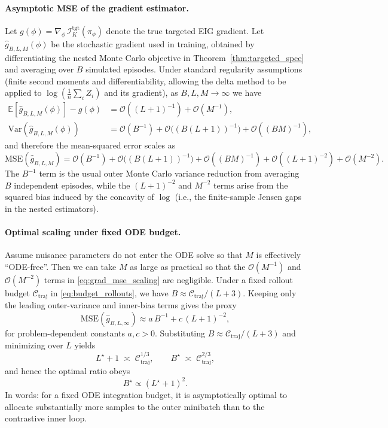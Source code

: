 \paragraph{Asymptotic MSE of the gradient estimator.}
Let $g(\phi)=\nabla_\phi\,\mathcal{I}_K^{\text{tgt}}(\pi_\phi)$ denote the true targeted EIG gradient.
Let $\hat g_{B,L,M}(\phi)$ be the stochastic gradient used in training, obtained by differentiating the nested Monte Carlo objective in Theorem~\ref{thm:targeted_spce} and averaging over $B$ simulated episodes.
Under standard regularity assumptions (finite second moments and differentiability, allowing the delta method to be applied to $\log(\tfrac{1}{n}\sum_i Z_i)$ and its gradient), as $B,L,M\to\infty$ we have
\begin{align}
\mathbb{E}[\hat g_{B,L,M}(\phi)] - g(\phi) &= \mathcal{O}((L+1)^{-1}) + \mathcal{O}(M^{-1}), \\
\mathrm{Var}(\hat g_{B,L,M}(\phi)) &= \mathcal{O}(B^{-1}) + \mathcal{O}\big((B(L+1))^{-1}\big) + \mathcal{O}((BM)^{-1}),
\end{align}
and therefore the mean-squared error scales as
\begin{equation}
\label{eq:grad_mse_scaling}
\mathrm{MSE}(\hat g_{B,L,M})
= \mathcal{O}(B^{-1})
+ \mathcal{O}\big((B(L+1))^{-1}\big)
+ \mathcal{O}((BM)^{-1})
+ \mathcal{O}((L+1)^{-2})
+ \mathcal{O}(M^{-2}).
\end{equation}
The $B^{-1}$ term is the usual outer Monte Carlo variance reduction from averaging $B$ independent episodes, while the $(L+1)^{-2}$ and $M^{-2}$ terms arise from the squared bias induced by the concavity of $\log$ (i.e., the finite-sample Jensen gaps in the nested estimators).

\paragraph{Optimal scaling under fixed ODE budget.}
Assume nuisance parameters do not enter the ODE solve so that $M$ is effectively ``ODE-free''.
Then we can take $M$ as large as practical so that the $\mathcal{O}(M^{-1})$ and $\mathcal{O}(M^{-2})$ terms in \eqref{eq:grad_mse_scaling} are negligible.
Under a fixed rollout budget $\mathcal{C}_{\text{traj}}$ in \eqref{eq:budget_rollouts}, we have $B \approx \mathcal{C}_{\text{traj}}/(L+3)$.
Keeping only the leading outer-variance and inner-bias terms gives the proxy
\begin{equation}
\mathrm{MSE}(\hat g_{B,L,\infty}) \approx a\,B^{-1} + c\,(L+1)^{-2},
\end{equation}
for problem-dependent constants $a,c>0$.
Substituting $B\approx \mathcal{C}_{\text{traj}}/(L+3)$ and minimizing over $L$ yields
\begin{equation}
L^\star + 1 \;\asymp\; \mathcal{C}_{\text{traj}}^{1/3},
\qquad
B^\star \;\asymp\; \mathcal{C}_{\text{traj}}^{2/3},
\end{equation}
and hence the optimal ratio obeys
\begin{equation}
\label{eq:bl_quadratic_scaling}
B^\star \propto (L^\star+1)^2.
\end{equation}
In words: for a fixed ODE integration budget, it is asymptotically optimal to allocate substantially more samples to the outer minibatch than to the contrastive inner loop.

